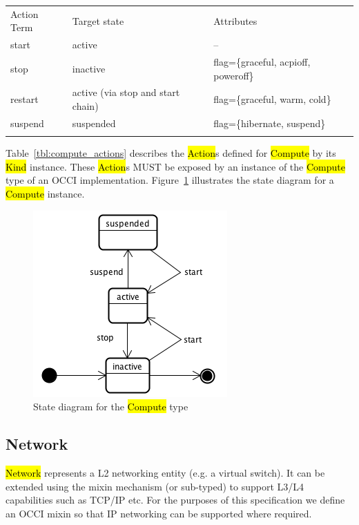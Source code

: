 \documentclass[10pt,a4paper]{article}
\begin{document}

{
	\begin{tabular}{lll}
	\toprule
	Action Term & Target state & Attributes \\
	\colrule
	start & active & -- \\
	stop & inactive & flag=\{graceful, acpioff, poweroff\} \\
	restart & active (via stop and start chain) & flag=\{graceful, warm, cold\} \\
	suspend & suspended & flag=\{hibernate, suspend\} \\
	\botrule
	\end{tabular}
}

Table~\ref{tbl:compute_actions} describes the \hl{Action}s defined for
\hl{Compute} by its \hl{Kind} instance. These \hl{Action}s MUST be exposed 
by an instance of the \hl{Compute} type of an OCCI implementation. 
Figure~\ref{fig:compute_state} illustrates the state diagram for a \hl{Compute} instance.

\begin{figure}[!h]
	\centering
	\includegraphics[scale=0.4]{figs/compute-state.png}
	\caption{State diagram for the \hl{Compute} type}
	\label{fig:compute_state}
\end{figure}

\subsection{Network}
\hl{Network} represents a L2 networking entity (e.g. a virtual switch). It can be extended using 
the mixin mechanism (or sub-typed) to support L3/L4 capabilities such as TCP/IP etc. 
For the purposes of this specification we define an OCCI mixin so that IP networking can be supported
where required. 
\end{document}
